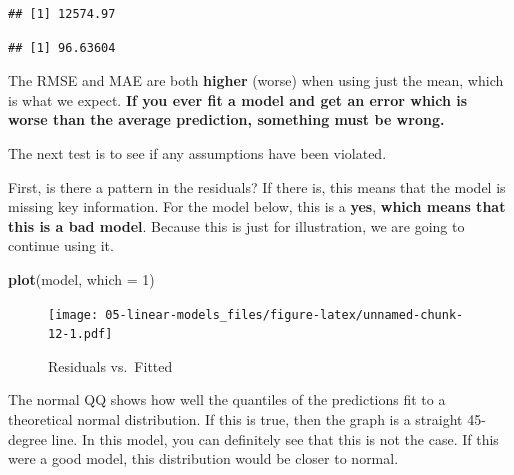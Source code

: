 \documentclass[
  openany]{book}
\newenvironment{Shaded}{\begin{snugshade}}{\end{snugshade}}
\newcommand{\DataTypeTok}[1]{\textcolor[rgb]{0.13,0.29,0.53}{#1}}
\newcommand{\DecValTok}[1]{\textcolor[rgb]{0.00,0.00,0.81}{#1}}
\newcommand{\KeywordTok}[1]{\textcolor[rgb]{0.13,0.29,0.53}{\textbf{#1}}}
\newcommand{\NormalTok}[1]{#1}
\newcommand{\OperatorTok}[1]{\textcolor[rgb]{0.81,0.36,0.00}{\textbf{#1}}}
\begin{document}
\begin{Shaded}
\end{Shaded}

\begin{verbatim}
## [1] 12574.97
\end{verbatim}

\begin{Shaded}
\end{Shaded}

\begin{verbatim}
## [1] 96.63604
\end{verbatim}

The RMSE and MAE are both \textbf{higher} (worse) when using just the mean, which is what we expect. \textbf{If you ever fit a model and get an error which is worse than the average prediction, something must be wrong.}

The next test is to see if any assumptions have been violated.

First, is there a pattern in the residuals? If there is, this means that the model is missing key information. For the model below, this is a \textbf{yes}, \textbf{which means that this is a bad model}. Because this is just for illustration, we are going to continue using it.

\begin{Shaded}
\begin{Highlighting}[]
\KeywordTok{plot}\NormalTok{(model, }\DataTypeTok{which =} \DecValTok{1}\NormalTok{)}
\end{Highlighting}
\end{Shaded}

\begin{figure}
\centering
\texttt{[image: 05-linear-models\_files/figure-latex/unnamed-chunk-12-1.pdf]}
\caption{\label{fig:unnamed-chunk-12}Residuals vs.~Fitted}
\end{figure}

The normal QQ shows how well the quantiles of the predictions fit to a theoretical normal distribution. If this is true, then the graph is a straight 45-degree line. In this model, you can definitely see that this is not the case. If this were a good model, this distribution would be closer to normal.
\end{document}
